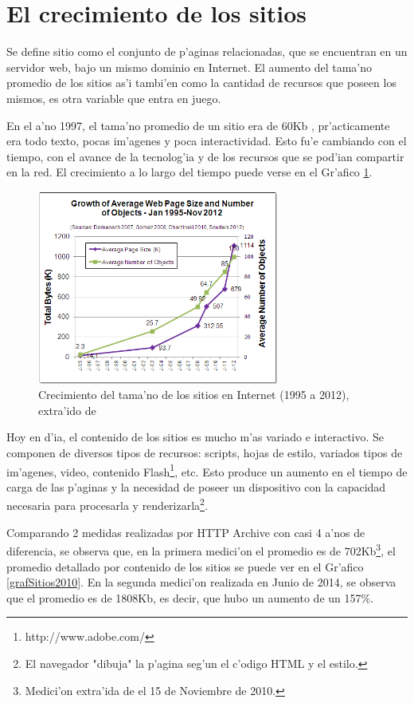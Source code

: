 \section{El crecimiento de los sitios}

Se define sitio como el conjunto de p'aginas relacionadas, que se encuentran en un servidor web, bajo un mismo dominio en Internet. El aumento del tama'no promedio de los sitios as'i tambi'en como la cantidad de recursos que poseen los mismos, es otra variable que entra en juego.

En el a'no 1997, el tama'no promedio de un sitio era de 60Kb \citep{atw}, pr'acticamente era todo texto, pocas im'agenes y poca interactividad. Esto fu'e cambiando con el tiempo, con el avance de la tecnolog'ia y de los recursos que se pod'ian compartir en la red. El crecimiento a lo largo del tiempo puede verse en el Gr'afico \ref{grafCrecSitios}.

\begin{figure}[ht!]
  	\centering
	\includegraphics[width=300px]{img/grafCrecSitios}
	\caption{\small Crecimiento del tama'no de los sitios en Internet (1995 a 2012), extra'ido de \cite{tamanoSitios}}
	\label{grafCrecSitios}
\end{figure}

Hoy en d'ia, el contenido de los sitios es mucho m'as variado e interactivo. Se componen de diversos tipos de recursos: scripts, hojas de estilo, variados tipos de im'agenes, video, contenido Flash\footnote{http://www.adobe.com/}, etc. Esto produce un aumento en el tiempo de carga de las p'aginas y la necesidad de poseer un dispositivo con la capacidad necesaria para procesarla y renderizarla\footnote{El navegador "dibuja" la p'agina seg'un el c'odigo HTML y el estilo.}.

Comparando 2 medidas realizadas por HTTP Archive\citep{httparchive}  con casi 4 a'nos de diferencia, se observa que, en la primera medici'on el promedio es de 702Kb\footnote{Medici'on extra'ida de \citep{httparchive} el 15 de Noviembre de 2010.}, el promedio detallado por contenido de los sitios se puede ver en el Gr'afico \ref{grafSitios2010}. En la segunda medici'on realizada en Junio de 2014, se observa que el promedio es de 1808Kb, es decir, que hubo un aumento de un 157\%.

